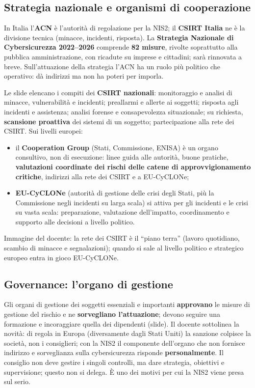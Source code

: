 \subsection{Strategia nazionale e organismi di cooperazione}
In Italia l'\textbf{ACN} è l'autorità di regolazione per la NIS2; il \textbf{CSIRT Italia} ne è la
divisione tecnica (minacce, incidenti, risposta). La \textbf{Strategia Nazionale di Cybersicurezza
2022--2026} comprende \textbf{82 misure}, rivolte soprattutto alla pubblica amministrazione, con ricadute
su imprese e cittadini; sarà rinnovata a breve. Sull'attuazione della strategia l'ACN ha un ruolo più
politico che operativo: dà indirizzi ma non ha poteri per imporla.

Le slide elencano i compiti dei \textbf{CSIRT nazionali}: monitoraggio e analisi di minacce,
vulnerabilità e incidenti; preallarmi e allerte ai soggetti; risposta agli incidenti e assistenza;
analisi forense e consapevolezza situazionale; su richiesta, \textbf{scansione proattiva} dei sistemi di
un soggetto; partecipazione alla rete dei CSIRT. Sui livelli europei:
\begin{itemize}
  \item il \textbf{Cooperation Group} (Stati, Commissione, ENISA) è un organo consultivo, non di
    esecuzione: linee guida alle autorità, buone pratiche, \textbf{valutazioni coordinate dei rischi
    delle catene di approvvigionamento critiche}, indirizzi alla rete dei CSIRT e a EU-CyCLONe;
  \item \textbf{EU-CyCLONe} (autorità di gestione delle crisi degli Stati, più la Commissione negli
    incidenti su larga scala) si attiva per gli incidenti e le crisi su vasta scala: preparazione,
    valutazione dell'impatto, coordinamento e supporto alle decisioni a livello politico.
\end{itemize}
Immagine del docente: la rete dei CSIRT è il ``piano terra'' (lavoro quotidiano, scambio di minacce e
segnalazioni); quando si sale al livello politico e strategico europeo entra in gioco EU-CyCLONe.

\subsection{Governance: l'organo di gestione}
Gli organi di gestione dei soggetti essenziali e importanti \textbf{approvano} le misure di gestione del
rischio e ne \textbf{sorvegliano l'attuazione}; devono seguire una formazione e incoraggiare quella dei
dipendenti (slide). Il docente sottolinea la novità: di regola in Europa (diversamente dagli Stati
Uniti) la sanzione colpisce la società, non i consiglieri; con la NIS2 il componente dell'organo che non
fornisce indirizzo e sorveglianza sulla cybersicurezza risponde \textbf{personalmente}. Il consiglio
non deve gestire i singoli controlli, ma dare strategia, obiettivi e supervisione; questo non si
delega. È uno dei motivi per cui la NIS2 viene presa sul serio.

